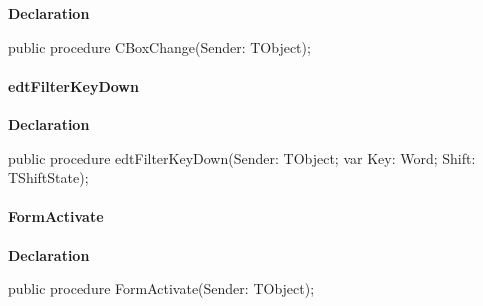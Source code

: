 \documentclass{report}
\newif\ifpdf
\begin{document}
\label{manager.TMnFrm-CBoxChange}
\begin{list}{}{
\setlength{\itemindent}{0cm}
\setlength{\listparindent}{0cm}
\setlength{\leftmargin}{\evensidemargin}
\addtolength{\leftmargin}{\tmplength}
\settowidth{\labelsep}{X}
\addtolength{\leftmargin}{\labelsep}
\setlength{\labelwidth}{\tmplength}
}
\item[\textbf{Declaration}\hfill]
\ifpdf
\begin{flushleft}
\fi
\begin{ttfamily}
public procedure CBoxChange(Sender: TObject);\end{ttfamily}

\ifpdf
\end{flushleft}
\fi

\end{list}
\paragraph*{edtFilterKeyDown}\hspace*{\fill}

\label{manager.TMnFrm-edtFilterKeyDown}
\begin{list}{}{
\setlength{\itemindent}{0cm}
\setlength{\listparindent}{0cm}
\setlength{\leftmargin}{\evensidemargin}
\addtolength{\leftmargin}{\tmplength}
\settowidth{\labelsep}{X}
\addtolength{\leftmargin}{\labelsep}
\setlength{\labelwidth}{\tmplength}
}
\item[\textbf{Declaration}\hfill]
\ifpdf
\begin{flushleft}
\fi
\begin{ttfamily}
public procedure edtFilterKeyDown(Sender: TObject; var Key: Word; Shift: TShiftState);\end{ttfamily}

\ifpdf
\end{flushleft}
\fi

\end{list}
\paragraph*{FormActivate}\hspace*{\fill}

\label{manager.TMnFrm-FormActivate}
\begin{list}{}{
\setlength{\itemindent}{0cm}
\setlength{\listparindent}{0cm}
\setlength{\leftmargin}{\evensidemargin}
\addtolength{\leftmargin}{\tmplength}
\settowidth{\labelsep}{X}
\addtolength{\leftmargin}{\labelsep}
\setlength{\labelwidth}{\tmplength}
}
\item[\textbf{Declaration}\hfill]
\ifpdf
\begin{flushleft}
\fi
\begin{ttfamily}
public procedure FormActivate(Sender: TObject);\end{ttfamily}

\ifpdf
\end{flushleft}
\fi

\end{list}
\end{document}
